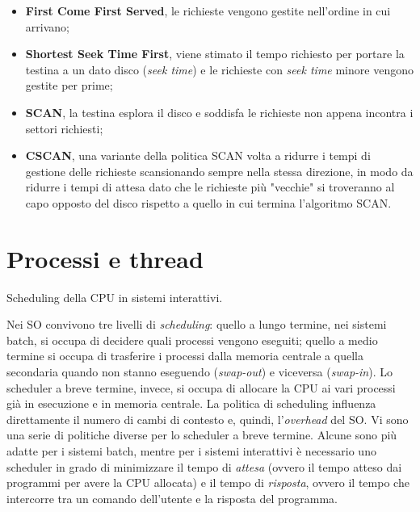 \documentclass[answers,a4paper,12pt]{exam}
\begin{document}
\begin{questions}
\begin{solutionorlines}[3.8in]
\begin{itemize}
	\item \textbf{First Come First Served}, le richieste vengono gestite nell'ordine in cui arrivano;
	\item \textbf{Shortest Seek Time First}, viene stimato il tempo richiesto per portare la testina a un dato disco (\textit{seek time}) e le richieste con \textit{seek time} minore vengono gestite per prime;
	\item \textbf{SCAN}, la testina esplora il disco e soddisfa le richieste non appena incontra i settori richiesti;
	\item \textbf{CSCAN}, una variante della politica SCAN volta a ridurre i tempi di gestione delle richieste scansionando sempre nella stessa direzione, in modo da ridurre i tempi di attesa dato che le richieste più "vecchie" si troveranno al capo opposto del disco rispetto a quello in cui termina l'algoritmo SCAN.
\end{itemize}
	\end{solutionorlines}

\section{Processi e thread}
\question
Scheduling della CPU in sistemi interattivi.
\begin{solutionorlines}[3.8in]
	Nei SO convivono tre livelli di \textit{scheduling}: quello a lungo termine, nei sistemi batch, si occupa di decidere quali processi vengono eseguiti; quello a medio termine si occupa di trasferire i processi dalla memoria centrale a quella secondaria quando non stanno eseguendo (\textit{swap-out}) e viceversa (\textit{swap-in}). Lo scheduler a breve termine, invece, si occupa di allocare la CPU ai vari processi già in esecuzione e in memoria centrale. La politica di scheduling influenza direttamente il numero di cambi di contesto e, quindi, l'\textit{overhead} del SO. Vi sono una serie di politiche diverse per lo scheduler a breve termine. Alcune sono più adatte per i sistemi batch, mentre per i sistemi interattivi è necessario uno scheduler in grado di minimizzare il tempo di \textit{attesa} (ovvero il tempo atteso dai programmi per avere la CPU allocata) e il tempo di \textit{risposta}, ovvero il tempo che intercorre tra un comando dell'utente e la risposta del programma.
	

\end{solutionorlines}
\end{questions}
\end{document}
